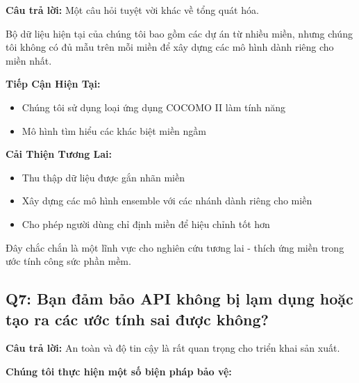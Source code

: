 \documentclass[12pt,a4paper]{article}
\begin{document}
\textbf{Câu trả lời:} Một câu hỏi tuyệt vời khác về tổng quát hóa.

Bộ dữ liệu hiện tại của chúng tôi bao gồm các dự án từ nhiều miền, nhưng chúng tôi không có đủ mẫu trên mỗi miền để xây dựng các mô hình dành riêng cho miền nhất.

\textbf{Tiếp Cận Hiện Tại:}
\begin{itemize}
    \item Chúng tôi sử dụng loại ứng dụng COCOMO II làm tính năng
    \item Mô hình tìm hiểu các khác biệt miền ngầm
\end{itemize}

\textbf{Cải Thiện Tương Lai:}
\begin{itemize}
    \item Thu thập dữ liệu được gắn nhãn miền
    \item Xây dựng các mô hình ensemble với các nhánh dành riêng cho miền
    \item Cho phép người dùng chỉ định miền để hiệu chỉnh tốt hơn
\end{itemize}

Đây chắc chắn là một lĩnh vực cho nghiên cứu tương lai - thích ứng miền trong ước tính công sức phần mềm.

\subsection*{Q7: Bạn đảm bảo API không bị lạm dụng hoặc tạo ra các ước tính sai được không?}

\textbf{Câu trả lời:} An toàn và độ tin cậy là rất quan trọng cho triển khai sản xuất.

\textbf{Chúng tôi thực hiện một số biện pháp bảo vệ:}
\end{document}

